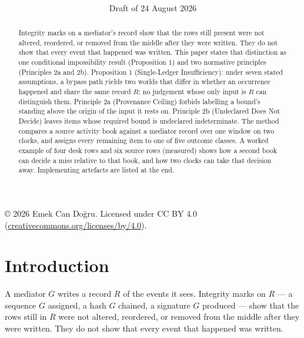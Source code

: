 \documentclass[11pt]{article}
\title{\papertitlefirst\\
\papertitlesecond}
\author{\paperauthorname\\
\paperaffiliation}
\date{Draft of 24 August 2026}
\newcommand{\paperauthorname}{Emek Can Doğru}
\begin{document}
\maketitle

\begin{abstract}
Integrity marks on a mediator's record show that the rows still present were not altered, reordered, or removed from the middle after they were written. They do not show that every event that happened was written. This paper states that distinction as one conditional impossibility result (Proposition 1) and two normative principles (Principles 2a and 2b). Proposition 1 (Single-Ledger Insufficiency): under seven stated assumptions, a bypass path yields two worlds that differ in whether an occurrence happened and share the same record $R$; no judgement whose only input is $R$ can distinguish them. Principle 2a (Provenance Ceiling) forbids labelling a bound's standing above the origin of the input it rests on. Principle 2b (Undeclared Does Not Decide) leaves items whose required bound is undeclared indeterminate. The method compares a source activity book against a mediator record over one window on two clocks, and assigns every remaining item to one of five outcome classes. A worked example of four desk rows and six source rows (measured) shows how a second book can decide a miss relative to that book, and how two clocks can take that decision away. Implementing artefacts are listed at the end.
\end{abstract}

\begin{center}
\copyright{} 2026 \paperauthorname. Licensed under CC BY 4.0
(\href{https://creativecommons.org/licenses/by/4.0/}{creativecommons.org/licenses/by/4.0}).
\end{center}

\section{Introduction}

A mediator $G$ writes a record $R$ of the events it sees. Integrity marks on $R$ --- a sequence $G$ assigned, a hash $G$ chained, a signature $G$ produced --- show that the rows still in $R$ were not altered, reordered, or removed from the middle after they were written. They do not show that every event that happened was written.
\end{document}
